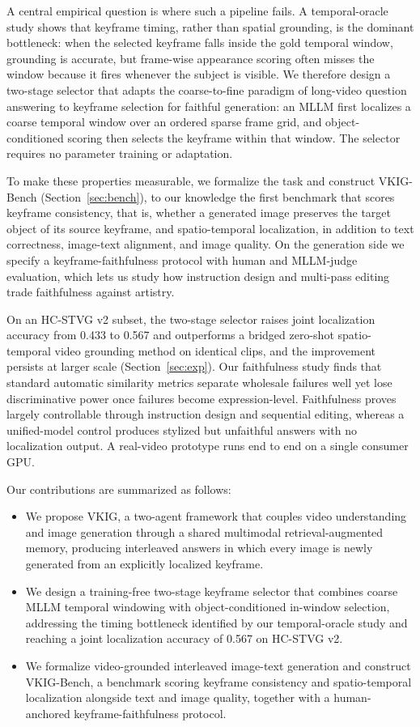 A central empirical question is where such a pipeline fails.
A temporal-oracle study shows that keyframe timing, rather than spatial
grounding, is the dominant bottleneck: when the selected keyframe falls
inside the gold temporal window, grounding is accurate, but frame-wise
appearance scoring often misses the window because it fires whenever the
subject is visible.
We therefore design a two-stage selector that adapts the coarse-to-fine
paradigm of long-video question answering \citep{unitime2506,focus2510} to
keyframe selection for faithful generation: an MLLM first localizes a coarse
temporal window over an ordered sparse frame grid, and object-conditioned
scoring then selects the keyframe within that window.
The selector requires no parameter training or adaptation.

To make these properties measurable, we formalize the task and construct
VKIG-Bench (Section~\ref{sec:bench}), to our knowledge the first benchmark
that scores keyframe consistency, that is, whether a generated image
preserves the target object of its source keyframe, and spatio-temporal
localization, in addition to text correctness, image-text alignment, and
image quality.
On the generation side we specify a keyframe-faithfulness protocol with human
and MLLM-judge evaluation, which lets us study how instruction design and
multi-pass editing trade faithfulness against artistry.

On an HC-STVG v2 subset, the two-stage selector raises joint localization
accuracy from 0.433 to 0.567 and outperforms a bridged zero-shot
spatio-temporal video grounding method \citep{zeroshotstvg2509} on identical
clips, and the improvement persists at larger scale
(Section~\ref{sec:exp}).
Our faithfulness study finds that standard automatic similarity metrics
separate wholesale failures well yet lose discriminative power once failures
become expression-level.
Faithfulness proves largely controllable through instruction design and
sequential editing, whereas a unified-model control produces stylized but
unfaithful answers with no localization output.
A real-video prototype runs end to end on a single consumer GPU.

Our contributions are summarized as follows:
\begin{itemize}
\item We propose VKIG, a two-agent framework that couples video understanding
and image generation through a shared multimodal retrieval-augmented memory,
producing interleaved answers in which every image is newly generated from an
explicitly localized keyframe.
\item We design a training-free two-stage keyframe selector that combines
coarse MLLM temporal windowing with object-conditioned in-window selection,
addressing the timing bottleneck identified by our temporal-oracle study and
reaching a joint localization accuracy of 0.567 on HC-STVG v2.
\item We formalize video-grounded interleaved image-text generation and
construct VKIG-Bench, a benchmark scoring keyframe consistency and
spatio-temporal localization alongside text and image quality, together with
a human-anchored keyframe-faithfulness protocol.
\end{itemize}
